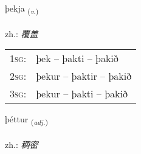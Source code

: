 \documentclass[frontgrid, backgrid]{flacards}\usepackage[]{graphicx}\usepackage[]{xcolor}
\begin{document}
\renewcommand{\flhead}{\vskip5pt \fboxsep=0pt {\small\bfseries\footnotesize Sagnorð | 动词}}
\renewcommand{\fcfoot}{\vskip5pt \fboxsep=0pt \hspace{2pt}{\small\bfseries\footnotesize 3K}}

\renewcommand{\blhead}{\vskip5pt {\small\bfseries\footnotesize Sagnorð | 动词 }}
\renewcommand{\bcfoot}{\vskip5pt \hspace{2pt}{\small\bfseries\footnotesize 3K}}


{þekja \small{\textsubscript{(\textit{v.})}} \\[1ex] %
\textphonetic{[θɛːca]} \\
zh.: \emph{覆盖} \\  [2ex]
\renewcommand*{\arraystretch}{0.8}
\begin{tabular}{p{1cm}l}
\textsc{1sg}: & þek -- þakti -- þakið \\ 
\textsc{2sg}: & þekur -- þaktir -- þakið \\ 
\textsc{3sg}: & þekur -- þakti -- þakið \\ 
\end{tabular}
}

\renewcommand{\flhead}{\vskip5pt \fboxsep=0pt {\small\bfseries\footnotesize Lýsingarorð | 形容词}}
\renewcommand{\fcfoot}{\vskip5pt \fboxsep=0pt \hspace{2pt}{\small\bfseries\footnotesize 3K}}

\renewcommand{\blhead}{\vskip5pt {\small\bfseries\footnotesize Lýsingarorð | 形容词 }}
\renewcommand{\bcfoot}{\vskip5pt \hspace{2pt}{\small\bfseries\footnotesize 3K}}


{þéttur \small{\textsubscript{(\textit{adj.})}} \\[1ex] %
\textphonetic{[θjɛhtʏr]} \\
zh.: \emph{稠密} \\  [2ex]
\renewcommand*{\arraystretch}{0.8}
}
\end{document}
